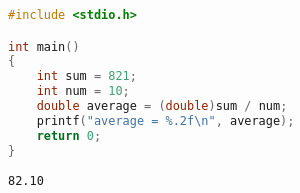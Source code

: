 \vspace{0.5cm}


\begin{lstlisting}[language=C]
#include <stdio.h>

int main()
{
	int sum = 821;
	int num = 10;
	double average = (double)sum / num;
	printf("average = %.2f\n", average);
	return 0;
}
\end{lstlisting}

\begin{tcolorbox}
	\begin{verbatim}
82.10
	\end{verbatim}
\end{tcolorbox}

\newpage